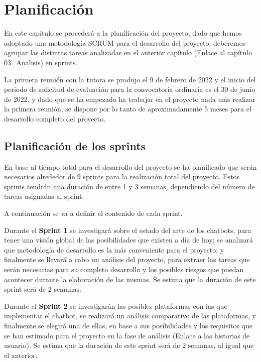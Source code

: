 \chapter{Planificación}

En este capítulo se procederá a la planificación del proyecto, dado que hemos adoptado una metodología SCRUM para el desarrollo del proyecto, deberemos agrupar las distintas tareas analizadas en el anterior capítulo (Enlace al capítulo 03\_Analisis) en sprints.

La primera reunión con la tutora se produjo el 9 de febrero de 2022 y el inicio del periodo de solicitud de evaluación para la convocatoria ordinaria es el 30 de junio de 2022, y dado que se ha empezado ha trabajar en el proyecto nada más realizar la primera reunión; se dispone por lo tanto de aproximadamente 5 meses para el desarrollo completo del proyecto.


\section{Planificación de los sprints}

En base al tiempo total para el desarrollo del proyecto se ha planificado que serán necesarios alrededor de 9 sprints para la realización total del proyecto. Estos sprints tendrán una duración de entre 1 y 3 semanas, dependiendo del número de tareas asignadas al sprint.

A continuación se va a definir el contenido de cada sprint.

Durante el \textbf{Sprint 1} se investigará sobre el estado del arte de los chatbots, para tener una visión global de las posibilidades que existen a día de hoy; se analizará que metodología de desarrollo es la más conveniente para el proyecto; y finalmente se llevará a cabo un análisis del proyecto, para extraer las tareas que serán necesarias para su completo desarrollo y los posibles riesgos que puedan acontecer durante la elaboración de las mismas. Se estima que la duración de este sprint será de 2 semanas.

Durante el \textbf{Sprint 2} se investigarán las posibles plataformas con las que implementar el chatbot, se realizará un análisis comparativo de las plataformas, y finalmente se elegirá una de ellas, en base a sus posibilidades y los requisitos que se han estimado para el proyecto en la fase de análisis (Enlace a las historias de usuario). Se estima que la duración de este sprint será de 2 semanas, al igual que el anterior.

